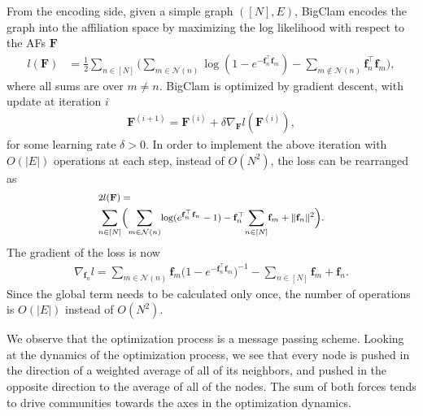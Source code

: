 \documentclass{article}
\theoremstyle{plain}
\theoremstyle{definition}
\theoremstyle{remark}
\newcommand{\sumgraph}{\underset{n \in [N]}{\sum}}
\def \sumgraphu {\underset{n\in [N]}{ \sum}}
\def \sumneighbors {\underset {m\in{\mathcal{N}(n)}}{\sum}}
\def \sumstrangers{\underset {m\notin{\mathcal{N}(n)}}{\sum}}
\begin{document}
From the encoding side, given a simple graph $([N],E)$, BigClam encodes the graph into the affiliation space by maximizing the log likelihood with respect to the AFs $\mathbf{F}$
\begingroup
\footnotesize
\begin{align}
\label{eqn:naiveloss}
     l(\mathbf{F}) &= \frac{1}{2}\sumgraph \Big(\sumneighbors{}{\log(1-e^{-\mathbf{f}_n^{\top } \mathbf{f}_m})} - 
 \sumstrangers{\mathbf{f}_n^{\top } \mathbf{f}_m}\Big),
 \end{align}
 \endgroup
where all sums are over $m\neq n$. BigClam is optimized by gradient descent, with update at iteration $i$
    \begin{align}
    \label{eqn:vanilla_optimization}
    \mathbf{F}^{(i+1)} = \mathbf{F}^{(i)} + \delta\nabla_{\mathbf{F}}l({\mathbf{F}}^{(i)}),
    \end{align}
for some learning rate $\delta>0$.
In order to implement the above iteration with $O(|E|)$ operations at each step, instead of $O(N^2)$, the loss can be rearranged as
\begingroup
\begin{equation}
\footnotesize
\begin{aligned}
\label{eqn:comp_loss}
   &  2l(\mathbf{F})=\\
   & \sumgraphu \Big(\sumneighbors{\log(e^{\mathbf{f}_n^{\top } \mathbf{f}_n} - 1)}  - \mathbf{f}_n^\top {\sumgraph{\mathbf{f}_m}} + \|\mathbf{f}_n\|^2\Big).
\end{aligned}
\end{equation}
\endgroup
The gradient of the loss is now
\begin{align}
\label{eqn:BCupdate}
    \nabla_{\mathbf{f}_n}l = 
    \sumneighbors{\mathbf{f}_m \big(1-e^{-\mathbf{f}_n^\top  \mathbf{f}_m}
    \big)^{-1}} - \sumgraph{\mathbf{f}_m} + \mathbf{f}_n .
\end{align}
Since the global term needs to be calculated only once, the number of operations is  $O(|E|)$ instead of $O(N^2)$.  

We observe that the optimization process is a message passing scheme.
Looking at the dynamics of the optimization process, we see that every node is pushed in the direction of a weighted average of all of its neighbors, and pushed in the opposite direction to the average of all of the nodes. The sum of both forces tends to drive communities towards the axes in the optimization dynamics.
\end{document}
